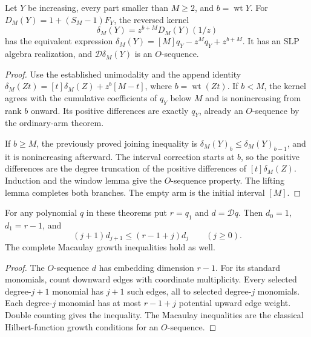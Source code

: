 \begin{theorem}
Let $Y$ be increasing, every part smaller than $M\ge2$,
and $b=\operatorname{wt}Y$. For
$D_M(Y)=1+(S_M-1)F_Y$, the reversed kernel
\[
                 \delta_M(Y)=z^{b+M}D_M(Y)(1/z)
\]
has the equivalent expression
$\delta_M(Y)=[M]q_Y-z^Mq_Y+z^{b+M}$.
It has an SLP algebra realization, and
$\mathcal D\delta_M(Y)$ is an $O$-sequence.
\end{theorem}
\begin{proof}
Use the established unimodality and the append identity
$\delta_M(Zt)=[t]\delta_M(Z)+z^b[M-t]$, where $b=\operatorname{wt}(Zt)$.
If $b<M$, the kernel agrees with the cumulative coefficients
of $q_Y$ below $M$ and is nonincreasing from rank $b$ onward.
Its positive differences are exactly $q_Y$, already an
$O$-sequence by the ordinary-arm theorem.

If $b\ge M$, the previously proved joining inequality is
$\delta_M(Y)_b\le\delta_M(Y)_{b-1}$, and it is nonincreasing
afterward. The interval correction starts at $b$, so the
positive differences are the degree truncation of the
positive differences of $[t]\delta_M(Z)$. Induction and the
window lemma give the $O$-sequence property. The lifting
lemma completes both branches. The empty arm is the
initial interval $[M]$.
\end{proof}

\begin{corollary}
For any polynomial $q$ in these theorems put $r=q_1$ and
$d=\mathcal Dq$. Then $d_0=1$, $d_1=r-1$, and
\[
                   (j+1)d_{j+1}\le(r-1+j)d_j\qquad(j\ge0).
\]
The complete Macaulay growth inequalities hold as well.
\end{corollary}
\begin{proof}
The $O$-sequence $d$ has embedding dimension $r-1$.
For its standard monomials, count downward edges with
coordinate multiplicity. Every selected degree-$j+1$
monomial has $j+1$ such edges, all to selected degree-$j$
monomials. Each degree-$j$ monomial has at most $r-1+j$
potential upward edge weight. Double counting gives the
inequality. The Macaulay inequalities are the classical
Hilbert-function growth conditions for an $O$-sequence.
\end{proof}

